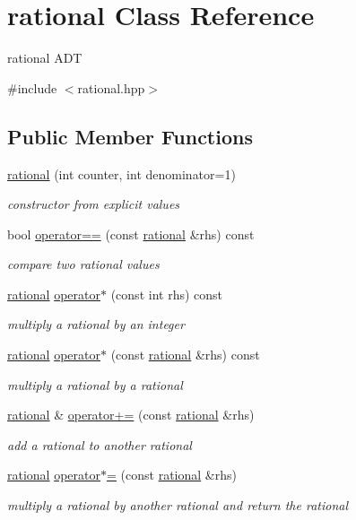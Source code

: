 \hypertarget{classrational}{}\section{rational Class Reference}
\label{classrational}


rational A\+DT  




{\ttfamily \#include $<$rational.\+hpp$>$}

\subsection*{Public Member Functions}
\begin{DoxyCompactItemize}
\item 
\hyperlink{classrational_a5f971ef33181044f54d8e4fee71cb957}{rational} (int counter, int denominator=1)
\begin{DoxyCompactList}\small\item\em constructor from explicit values \end{DoxyCompactList}\item 
bool \hyperlink{classrational_a8b565720ea15ddfb17ea202e27698478}{operator==} (const \hyperlink{classrational}{rational} \&rhs) const
\begin{DoxyCompactList}\small\item\em compare two rational values \end{DoxyCompactList}\item 
\hyperlink{classrational}{rational} \hyperlink{classrational_a9c0f08f8be5db907dc6d93ad3f5cb26b}{operator$\ast$} (const int rhs) const
\begin{DoxyCompactList}\small\item\em multiply a rational by an integer \end{DoxyCompactList}\item 
\hyperlink{classrational}{rational} \hyperlink{classrational_a1dd39ab2daf08ee68087fdbb37be258e}{operator$\ast$} (const \hyperlink{classrational}{rational} \&rhs) const
\begin{DoxyCompactList}\small\item\em multiply a rational by a rational \end{DoxyCompactList}\item 
\hyperlink{classrational}{rational} \& \hyperlink{classrational_a9b83ad0c803d2ac242b42e71d954a356}{operator+=} (const \hyperlink{classrational}{rational} \&rhs)
\begin{DoxyCompactList}\small\item\em add a rational to another rational \end{DoxyCompactList}\item 
\hyperlink{classrational}{rational} \hyperlink{classrational_a2b5729aef261d16cd18ff7c7fcbf8c6e}{operator$\ast$=} (const \hyperlink{classrational}{rational} \&rhs)
\begin{DoxyCompactList}\small\item\em multiply a rational by another rational and return the rational \end{DoxyCompactList}\end{DoxyCompactItemize}
